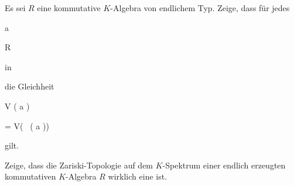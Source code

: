 {} {}



{}

{


Es sei $R$ eine kommutative $K$-Algebra von endlichem Typ. Zeige, dass für jedes


\mavergleichskette

{\vergleichskette

{ {\mathfrak a}
}

{ \subseteq }{ R
}

{  }{
}

{    }{
}

{   }{
}

}
{}{}{}
in

 die Gleichheit


\mavergleichskettedisp

{\vergleichskette

{ V ( {\mathfrak a} )
}

{ =} { V( \,  ( {\mathfrak a} ))
}

{ } {
}

{ } {
}

{ } {
}

}
{}{}{}
gilt.


}

{} {}



{}

{


Zeige, dass die Zariski-Topologie auf dem $K$-Spektrum einer endlich erzeugten kommutativen $K$-Algebra $R$ wirklich eine 
ist.


}

{} {}



{}


